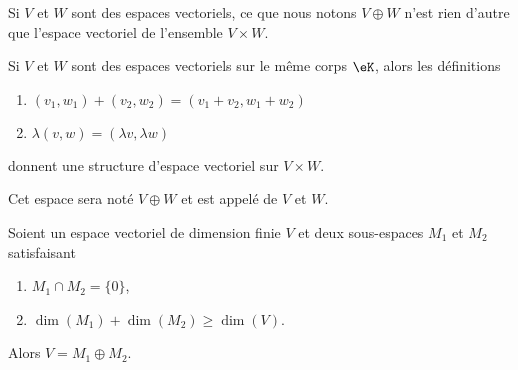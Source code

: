 Si \( V\) et \( W\) sont des espaces vectoriels, ce que nous notons \( V\oplus W\) n'est rien d'autre que l'espace vectoriel de l'ensemble \( V\times W\).

\begin{propositionDef}
    Si \( V\) et \( W\) sont des espaces vectoriels sur le même corps \( \eK\), alors les définitions
    \begin{enumerate}
        \item
            \( (v_1,w_1)+(v_2,w_2)=(v_1+v_2,w_1+w_2)\)
        \item
            \( \lambda(v,w)=(\lambda v,\lambda w)\)
    \end{enumerate}
    donnent une structure d'espace vectoriel sur \( V\times W\). 

    Cet espace sera noté \( V\oplus W\) et est appelé  de \( V\) et \( W\).
\end{propositionDef}

\begin{proposition}       \label{PROPooCASNooEqisqa}
    Soient un espace vectoriel de dimension finie \( V\) et deux sous-espaces \( M_1\) et \( M_2\) satisfaisant
    \begin{enumerate}
        \item
            \( M_1\cap M_2=\{ 0 \}\),
        \item
            \( \dim(M_1)+\dim(M_2)\geq \dim(V)\).
    \end{enumerate}
    Alors \( V=M_1\oplus M_2\).
\end{proposition}

